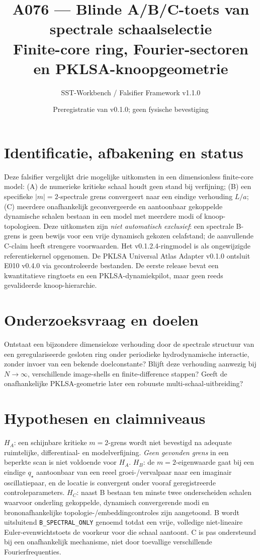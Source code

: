 \documentclass[11pt,a4paper]{article}
\title{A076 --- Blinde A/B/C-toets van spectrale schaalselectie\\
\large Finite-core ring, Fourier-sectoren en PKLSA-knoopgeometrie}
\author{SST-Workbench / Falsifier Framework v1.1.0}
\date{Preregistratie van v0.1.0; geen fysische bevestiging}
\begin{document}
\maketitle
\section{Identificatie, afbakening en status}
Deze falsifier vergelijkt drie mogelijke uitkomsten in een dimensionless finite-core model:
(A) de numerieke kritieke schaal houdt geen stand bij verfijning;
(B) een specifieke $|m|=2$-spectrale grens convergeert naar een eindige verhouding $L/a$;
(C) meerdere onafhankelijk geconvergeerde en aantoonbaar gekoppelde dynamische schalen bestaan in een model met meerdere modi of knoop-topologieen.
Deze uitkomsten zijn \emph{niet automatisch exclusief}: een spectrale B-grens is geen bewijs voor een vrije dynamisch gekozen celafstand; de aanvullende C-claim heeft strengere voorwaarden.
Het v0.1.2.4-ringmodel is als ongewijzigde referentiekernel opgenomen. De PKLSA Universal Atlas Adapter v0.1.0 ontsluit E010 v0.4.0 via gecontroleerde bestanden. De eerste release bevat een kwantitatieve ringtoets en een PKLSA-dynamiekpilot, maar geen reeds gevalideerde knoop-hierarchie.

\section{Onderzoeksvraag en doelen}
Ontstaat een bijzondere dimensieloze verhouding door de spectrale structuur van een geregulariseerde gesloten ring onder periodieke hydrodynamische interactie, zonder invoer van een bekende doelconstante? Blijft deze verhouding aanwezig bij $N\rightarrow\infty$, verschillende image-shells en finite-difference stappen? Geeft de onafhankelijke PKLSA-geometrie later een robuuste multi-schaal-uitbreiding?

\section{Hypothesen en claimniveaus}
$H_A$: een schijnbare kritieke $m=2$-grens wordt niet bevestigd na adequate ruimtelijke, differentiaal- en modelverfijning. \emph{Geen gevonden grens} in een beperkte scan is niet voldoende voor $H_A$.
$H_B$: de $m=2$-eigenwaarde gaat bij een eindige $q_\star$ aantoonbaar van een reeel groei-/vervalpaar naar een imaginair oscillatiepaar, en de locatie is convergent onder vooraf geregistreerde controleparameters.
$H_C$: naast B bestaan ten minste twee onderscheiden schalen waarvoor onderling gekoppelde, dynamisch convergerende modi en brononafhankelijke topologie-/embeddingcontroles zijn aangetoond.
B wordt uitsluitend \texttt{B\_SPECTRAL\_ONLY} genoemd totdat een vrije, volledige niet-lineaire Euler-evenwichtstoets de voorkeur voor die schaal aantoont. C is pas ondersteund bij een onafhankelijk mechanisme, niet door toevallige verschillende Fourierfrequenties.
\end{document}

